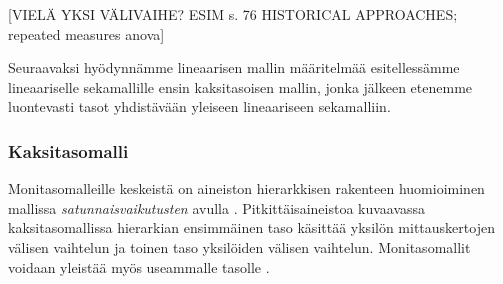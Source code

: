 \documentclass[finnish]{docopts}
\begin{document}


[VIELÄ YKSI VÄLIVAIHE? ESIM \cite{fitzmaurice11} s. 76 HISTORICAL APPROACHES; repeated measures anova]


Seuraavaksi hyödynnämme lineaarisen mallin määritelmää esitellessämme lineaariselle sekamallille ensin kaksitasoisen mallin, jonka jälkeen etenemme luontevasti tasot yhdistävään \cite{laird82} yleiseen lineaariseen sekamalliin.

\subsubsection{Kaksitasomalli}
\label{ssb:kaksitaso}

Monitasomalleille keskeistä on aineiston hierarkkisen rakenteen huomioiminen mallissa \textit{satunnaisvaikutusten} avulla \cite{talbott06}. Pitkittäisaineistoa kuvaavassa kaksitasomallissa hierarkian ensimmäinen taso käsittää yksilön mittauskertojen välisen vaihtelun ja toinen taso yksilöiden välisen vaihtelun. Monitasomallit voidaan yleistää myös useammalle tasolle \cite{goldstein11, burzykowski13}.
\end{document}
